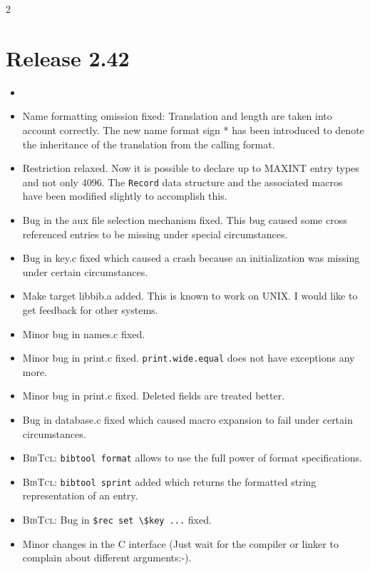 \documentclass[11pt,a4paper]{scrartcl}
\newcommand\rsc[1]{\texttt{#1}}
\newcommand\File[1]{\textsf{#1}}
\newcommand\BibTcl{\textsc{BibTcl}}
\newenvironment{Releases}{\begin{multicols}2\RaggedRight}{\end{multicols}}
\newenvironment{Release}[2]{%
  \def\tmp{#2}%
  \section*{Release #1 \ifx\tmp\empty\else{\normalsize[#2]}\fi}
  \begin{itemize}
}{\end{itemize}}
\newenvironment{Fix}[1]{\item }{}
\newenvironment{New}[1]{\item }{}
\newenvironment{Update}[1]{\item }{}
\begin{document}
\begin{Releases}
\begin{Release}{2.42}{}
\begin{Update}{gene}
  \end{Update}
  \begin{Fix}{gene}
    Name formatting omission fixed: Translation and length are taken
    into account correctly. The new name format sign * has been
    introduced to denote the inheritance of the translation from the
    calling format.
  \end{Fix}
  \begin{Update}{gene}
    Restriction relaxed. Now it is possible to declare up to MAXINT
    entry types and not only 4096. The \verb|Record| data structure
    and the associated macros have been modified slightly to
    accomplish this.
  \end{Update}
  \begin{Fix}{gene}
    Bug in the aux file selection mechanism fixed. This bug caused some cross
    referenced entries to be missing under special circumstances.
  \end{Fix}
  \begin{Fix}{gene}
    Bug in \File{key.c} fixed which caused a crash because an
    initialization was missing under certain circumstances.
  \end{Fix}
  \begin{New}{gene}
    Make target \File{libbib.a} added. This is known to work on UNIX. I would
    like to get feedback for other systems.
  \end{New}
  \begin{Fix}{gene}
    Minor bug in \File{names.c} fixed.
  \end{Fix}
  \begin{Fix}{gene}
    Minor bug in \File{print.c} fixed. \rsc{print.wide.equal} does not
    have exceptions any more.
  \end{Fix}
  \begin{Fix}{gene}
    Minor bug in \File{print.c} fixed. Deleted fields are treated better.
  \end{Fix}
  \begin{Fix}{gene}
    Bug in \File{database.c} fixed which caused macro expansion to fail under
    certain circumstances.
  \end{Fix}
  \begin{Update}{gene}
    \BibTcl: \verb|bibtool format| allows to use the full power of
    format specifications.
  \end{Update}
  \begin{New}{gene}
    \BibTcl: \verb|bibtool sprint| added which returns the formatted
    string representation of an entry.
  \end{New}
  \begin{Fix}{gene}
    \BibTcl: Bug in \verb|$rec set \$key ...| fixed.
  \end{Fix}
  \begin{Update}{gene}
    Minor changes in the C interface (Just wait for the compiler or
    linker to complain about different arguments:-).
  \end{Update}
 \end{Release}


\end{Releases}
\end{document}
